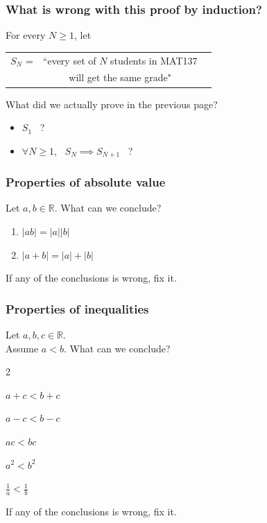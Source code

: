 \documentclass[14pt]{beamer}
\begin{document}
\begin{frame}
	\frametitle{What is wrong with this proof by induction?}

	For every $N \geq 1$, let
	\begin{center}
		\begin{tabular}{rcc}
			$\displaystyle S_{N}$ = & ``every set of $N$ students in MAT137 \\
			                        & will get the same grade"
		\end{tabular}
	\end{center}

	\vfill

	What did we actually prove in the previous page?

	\begin{itemize}
		\item $S_{1}$ \, ?

		\item $\displaystyle \forall N \geq 1$, \,
			$\displaystyle S_{N}\implies S_{N+1}$ \, ?
	\end{itemize}

	\vfill
\end{frame}

\begin{frame}
	\frametitle{Properties of absolute value}

	Let $a, b \in \mathbb{R}$. What can we conclude?

	\begin{enumerate}
		\item $\displaystyle |ab| = |a| |b|$

		\item $\displaystyle |a + b | = |a| + |b|$
	\end{enumerate}

	If any of the conclusions is wrong, fix it.
\end{frame}

\begin{frame}
	\frametitle{Properties of inequalities}

	Let $a, b, c \in \mathbb{R}$. \\ Assume $a < b$. What can we conclude?

	\begin{enumerate}
	\end{enumerate}

	If any of the conclusions is wrong, fix it.
\end{frame}
\end{document}
